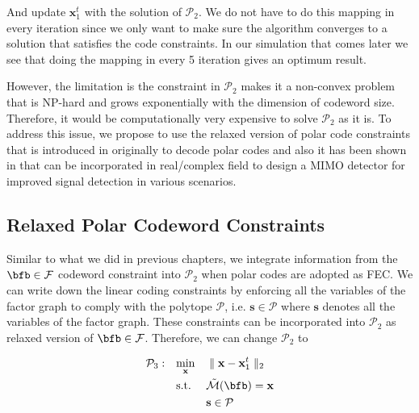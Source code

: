 And update $\mathbf{x}_1^t$ with the solution of $\mathcal{P}_2$. We do not have to do this mapping in every iteration since we only want to make sure
the algorithm converges to a solution that satisfies the code constraints. In our simulation that comes later we see that doing the mapping in every 5 
iteration gives an optimum result.

However, the limitation is the constraint in $\mathcal{P}_2$ makes it a non-convex problem that is NP-hard and grows exponentially
with the dimension of codeword size. Therefore,  it would be computationally very expensive to solve $\mathcal{P}_2$ as it is.
To address this issue, we propose to use the relaxed version of polar code constraints that is introduced in \cite{goela2010lp} originally to decode polar codes and 
also it has been shown in \cite{jalali2018joint} that can be incorporated in real/complex field to design a MIMO detector for improved signal detection in various scenarios. 








\subsection{Relaxed Polar Codeword Constraints}

Similar to what we did in previous chapters, we integrate information from the
$\bfb\in {\cal F}$ codeword constraint into $\mathcal{P}_2$ when polar codes are adopted as FEC. 
We can write down the linear coding 
constraints by enforcing all the variables of the 
factor graph to comply with the polytope $\mathcal{P}$, 
i.e. $\mathbf{s} \in \mathcal{P}$ where $\mathbf{s}$ 
denotes all the variables of the factor graph. These
constraints can be incorporated into $\mathcal{P}_2$
as relaxed version of $\bfb \in \cal F$.
Therefore, we can change $\mathcal{P}_2$ to

\begin{equation}
\begin{aligned}
\mathcal{P}_3: \quad &\underset{\mathbf{x}} {\text{min}} &&\parallel \mathbf{x} - \mathbf{x}_1^t \parallel_2\\
                                  &\text{s.t.} &&\cal{\tilde{M}}(\bfb) = \mathbf{x}\\
                                                      &&& \mathbf{s} \in \mathcal{P}\\
\end{aligned}
\end{equation}




